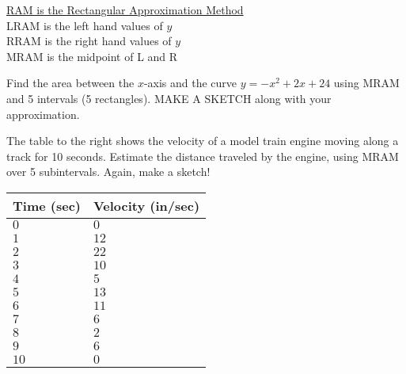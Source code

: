 \documentclass[addpoints, 12pt]{exam}
\newcommand\Tstrut{\rule{0pt}{2.6ex}}         %
\newcommand\Bstrut{\rule[-0.9ex]{0pt}{0pt}}   %
\begin{document}
\begin{questions}
    
    \begin{center}
        \underline{RAM is the Rectangular Approximation Method}\\
        LRAM is the left hand values of $y$\\
        RRAM is the right hand values of $y$\\
        MRAM is the midpoint of L and R
    \end{center}
    
    
    \newpage
    
    \question Find the area between the $x$-axis and the curve $y=-x^2+2x+24$ using MRAM and 5 intervals (5 rectangles). MAKE A SKETCH along with your approximation.
    
    
    \begin{minipage}[t]{0.55\linewidth}
    \question The table to the right shows the velocity of a model train engine moving along a track for 10 seconds. Estimate the distance traveled by the engine, using MRAM over 5 subintervals. Again, make a sketch!    
    \end{minipage}
    \hfill
    \begin{minipage}[t]{0.4\linewidth}
    \begin{longtable}[ht]{|C{2.25cm}|C{3cm}|}
        \hline
        Time (sec)\Tstrut\Bstrut & Velocity (in/sec)\Tstrut\Bstrut \\\hline
        $0$\Tstrut\Bstrut & $0$\Tstrut\Bstrut \\\hline
        $1$\Tstrut\Bstrut & $12$\Tstrut\Bstrut \\\hline
        $2$\Tstrut\Bstrut & $22$\Tstrut\Bstrut \\\hline
        $3$\Tstrut\Bstrut & $10$\Tstrut\Bstrut \\\hline
        $4$\Tstrut\Bstrut & $5$\Tstrut\Bstrut \\\hline 
        $5$\Tstrut\Bstrut & $13$\Tstrut\Bstrut \\\hline
        $6$\Tstrut\Bstrut & $11$\Tstrut\Bstrut \\\hline
        $7$\Tstrut\Bstrut & $6$\Tstrut\Bstrut \\\hline
        $8$\Tstrut\Bstrut & $2$\Tstrut\Bstrut \\\hline
        $9$\Tstrut\Bstrut & $6$\Tstrut\Bstrut \\\hline
        $10$\Tstrut\Bstrut & $0$\Tstrut\Bstrut \\\hline
    \end{longtable}    
    \end{minipage}
    


\end{questions}
\end{document}
